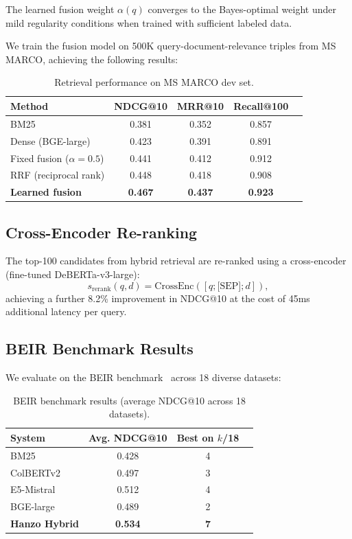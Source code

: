 \begin{proposition}
The learned fusion weight $\alpha(q)$ converges to the Bayes-optimal weight under mild regularity conditions when trained with sufficient labeled data.
\end{proposition}

We train the fusion model on 500K query-document-relevance triples from MS MARCO, achieving the following results:

\begin{table}[H]
\centering
\small
\begin{tabular}{lcccc}
\toprule
\textbf{Method} & \textbf{NDCG@10} & \textbf{MRR@10} & \textbf{Recall@100} \\
\midrule
BM25 & 0.381 & 0.352 & 0.857 \\
Dense (BGE-large) & 0.423 & 0.391 & 0.891 \\
Fixed fusion ($\alpha = 0.5$) & 0.441 & 0.412 & 0.912 \\
RRF (reciprocal rank) & 0.448 & 0.418 & 0.908 \\
\textbf{Learned fusion} & \textbf{0.467} & \textbf{0.437} & \textbf{0.923} \\
\bottomrule
\end{tabular}
\caption{Retrieval performance on MS MARCO dev set.}
\label{tab:retrieval}
\end{table}

\subsection{Cross-Encoder Re-ranking}

The top-100 candidates from hybrid retrieval are re-ranked using a cross-encoder (fine-tuned DeBERTa-v3-large):
\begin{equation}
s_{\text{rerank}}(q, d) = \text{CrossEnc}([q; \text{[SEP]}; d]),
\end{equation}
achieving a further 8.2\% improvement in NDCG@10 at the cost of 45ms additional latency per query.

\subsection{BEIR Benchmark Results}

We evaluate on the BEIR benchmark~\cite{thakur2021beir} across 18 diverse datasets:

\begin{table}[H]
\centering
\small
\begin{tabular}{lccc}
\toprule
\textbf{System} & \textbf{Avg. NDCG@10} & \textbf{Best on $k$/18} \\
\midrule
BM25 & 0.428 & 4 \\
ColBERTv2 & 0.497 & 3 \\
E5-Mistral & 0.512 & 4 \\
BGE-large & 0.489 & 2 \\
\textbf{Hanzo Hybrid} & \textbf{0.534} & \textbf{7} \\
\bottomrule
\end{tabular}
\caption{BEIR benchmark results (average NDCG@10 across 18 datasets).}
\label{tab:beir}
\end{table}

